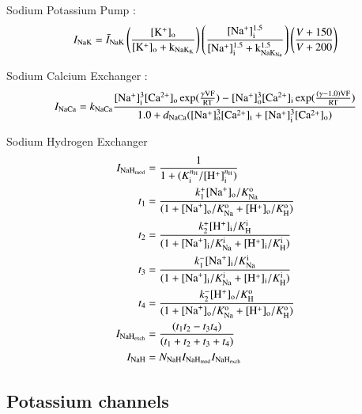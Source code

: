 Sodium Potassium Pump \citep[Table 12, pp. 77]{Nygrenetal1998}:
\begin{equation}
  I_{\rm NaK} =
  \bar{I}_{\rm NaK} \left( \frac{[\rm K^{+}]_{\rm o}}{[\rm K^{+}]_{\rm o} +
    k_{\rm NaK_{K}}} \right) \left(\frac{[\rm Na^{+}]^{1.5}_{\rm i}}{[\rm
    Na^{+}]^{1.5}_{\rm i} + k^{1.5}_{\rm NaK_{Na}}}\right) \left( \frac{V + 150}{V +
    200} \right)
\end{equation}

Sodium Calcium Exchanger \citep[Table 13, pp. 77]{Nygrenetal1998}:
\begin{equation}
  I_{\rm NaCa} = k_{\rm NaCa} \frac{[\rm Na^{+}]^{3}_{i}[\rm
    Ca^{2+}]_{o} \exp(\frac{\gamma V F}{R T}) - [\rm
    Na^{+}]^{3}_{o}[\rm Ca^{2+}]_{i} \exp(\frac{(\gamma - 1.0) V F}{R
      T})} {1.0 + d_{\rm NaCa}([\rm Na^{+}]^{3}_{o}[\rm Ca^{2+}]_{i} +
    [\rm Na^{+}]^{3}_{i}[\rm Ca^{2+}]_{o})}
\end{equation}

Sodium Hydrogen Exchanger \citep[Eq. 2, pp. 2675]{Chaetal2009}
\begin{equation}
  \begin{split}
    I_{{\rm NaH}_{\rm mod}} & = \frac{1}{1 + (K_{\rm i}^{n_{\rm
          H}}/[{\rm H}^{+}]_{\rm i}^{n_{\rm H}})}\\
    t_{1} & = \frac{k_{1}^{+} [{\rm Na}^{+}]_{\rm o}/K_{\rm Na}^{\rm
        o}} {(1 + [{\rm Na}^{+}]_{\rm o}/K_{\rm Na}^{\rm o} + [{\rm
        H}^{+}]_{\rm o} /K_{\rm H}^{\rm o})}\\
    t_{2} & = \frac{k_{2}^{+} [{\rm H}^{+}]_{\rm i}/K_{\rm H}^{\rm i}}
    {(1 + [{\rm Na}^{+}]_{\rm i}/K_{\rm Na}^{\rm i} + [{\rm
        H}^{+}]_{\rm i}/K_{\rm H}^{\rm i})}\\
    t_{3} & = \frac{k_{1}^{-} [{\rm Na}^{+}]_{\rm i}/K_{\rm Na}^{\rm
        i}} {(1 + [{\rm Na}^{+}]_{\rm i}/K_{\rm Na}^{\rm i} + [{\rm
        H}^{+}]_{\rm i} /K_{\rm H}^{\rm i})}\\
    t_{4} & = \frac{k_{2}^{-} [{\rm H}^{+}]_{\rm o}/K_{\rm H}^{\rm
        o}} {(1 + [{\rm Na}^{+}]_{\rm o}/K_{\rm Na}^{\rm o} + [{\rm
        H}^{+}]_{\rm o} /K_{\rm H}^{\rm o})}\\
    I_{{\rm NaH}_{\rm exch}} & = \frac{(t_1 t_2 - t_3 t_4)}
    {(t_1 + t_2 + t_3 + t_4)}\\
    I_{\rm NaH} & = N_{\rm NaH} I_{\rm NaH_{\rm mod}}
    I_{\rm NaH_{\rm exch}}
  \end{split}
\end{equation}

\subsection{Potassium channels}
\label{sec:potassium-channels}

